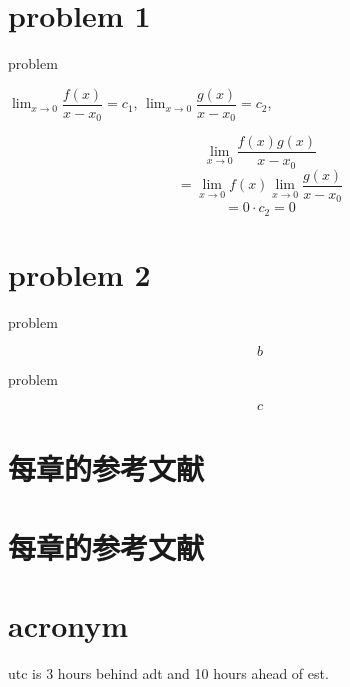 \documentclass[ebook,fleqn]{problemset}
\begin{document}
\listoftodos %
\tableofcontents %

\newpage
\setcounter{page}{1}

\chapter{problem 1}
  \begin{problem}
    problem
  \end{problem}

  \begin{solution}
    $\lim_{x \to 0} \dfrac{f(x)}{x-x_0} = c_1$,
    $\lim_{x \to 0} \dfrac{g(x)}{x-x_0} = c_2$,

    \[
      \lim_{x\to0} \dfrac{f(x)g(x)}{x-x_0}
    \]
    \[
     = \lim_{x\to0} f(x) \lim_{x \to 0} \dfrac{g(x)}{x-x_0}
    \]
    \[
      = 0 \cdot c_2 = 0
    \]
  \end{solution}
\chapter{problem 2}

  \begin{problem}
    problem
  \end{problem}
  \begin{solution}
      \[b\]
  \end{solution}
  \begin{problem}
    problem
  \end{problem}
  \begin{solution}
      \[c\]
  \end{solution}

\chapter{每章的参考文献}
  \newrefsection
  
  \printbibliography
\chapter{每章的参考文献}
  \newrefsection
  
  \printbibliography

\chapter{acronym}


\gls{utc} is 3 hours behind \gls{adt} and 10 hours ahead of \gls{est}.

\printglossary[type=\acronymtype,title={try acronym}]


\end{document}
